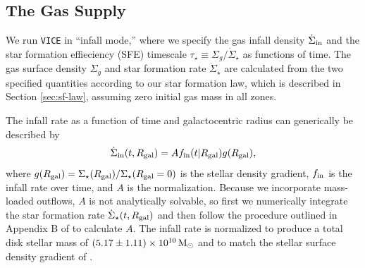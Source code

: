 \documentclass[twocolumn,twocolappendix,linenumbers]{aastex631}
\begin{document}
\subsection{The Gas Supply}
\label{sec:sfh}

We run {\tt VICE} in ``infall mode,'' where we specify the gas infall density $\dot\Sigma_{\rm in}$ and the star formation effieciency (SFE) timescale $\tau_\star\equiv \Sigma_g / \dot\Sigma_\star$ as functions of time. The gas surface density $\Sigma_g$ and star formation rate $\dot\Sigma_\star$ are calculated from the two specified quantities according to our star formation law, which is described in Section \ref{sec:sf-law}, assuming zero initial gas mass in all zones.

The infall rate as a function of time and galactocentric radius can generically be described by
\begin{equation}
    \label{eq:infall-rate}
    \dot\Sigma_{\rm in}(t,R_{\rm gal}) = A f_{\rm in}(t|R_{\rm gal}) g(R_{\rm gal}),
\end{equation}
where $g(R_{\rm gal})=\Sigma_\star(R_{\rm gal}) / \Sigma_\star(R_{\rm gal}=0)$ is the stellar density gradient, $f_{\rm in}$ is the infall rate over time, and $A$ is the normalization. Because we incorporate mass-loaded outflows, $A$ is not analytically solvable, so first we numerically integrate the star formation rate $\dot\Sigma_\star(t,R_{\rm gal})$ and then follow the procedure outlined in Appendix B of \citet{johnson_stellar_2021} to calculate $A$. The infall rate is normalized to produce a total disk stellar mass of $(5.17\pm1.11)\times 10^{10}\,{\rm M}_\odot$ \citep{licquia_improved_2015} and to match the stellar surface density gradient of \citet{bland-hawthorn_galaxy_2016}.
\end{document}
